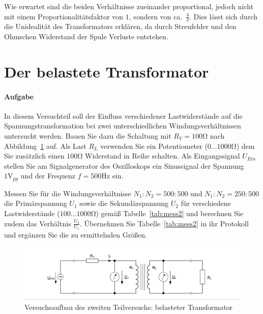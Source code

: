 \documentclass[10pt]{scrreprt}
\begin{document}
        Wie erwartet sind die beiden Verhältnisse zueinander proportional, jedoch
        nicht mit einem Proportionalitätsfaktor von $1$, sondern von ca.~$\frac{4}{3}$.
        Dies lässt sich durch die Unidealität des Transformators erklären, da durch
        Streufelder und den Ohmschen Widerstand der Spule Verluste entstehen.


        \section{Der belastete Transformator}
        \paragraph{Aufgabe}
        In diesem Versuchteil soll der Einfluss verschiedener Lastwiderstände auf die
        Spannungstransformation bei zwei unterschiedlichen Windungsverhältnissen untersucht werden.
        Bauen Sie dazu die Schaltung mit $R_V = 100\si{\ohm}$ nach Abbildung~\ref{fig:abb9} auf. Als Last $R_L$ verwenden Sie ein
        Potentiometer ($0\ldots1000\si{\ohm}$) dem Sie zusätzlich einen $100\si{\ohm}$ Widerstand in Reihe schalten.
        Als Eingangssignal $U_{Ein}$ stellen Sie am Signalgenerator des Oszilloskops ein Sinussignal
        der Spannung $1 \si{\volt}_{pp}$ und der Frequenz $f = 500\si{\hertz}$ ein.

        \vspace{0.5cm}

        Messen Sie für die Windungsverhältnisse $N_1 : N_2 = 500 : 500$ und $N_1 : N_2 = 250 : 500$
        die Primärspannung $U_1$ sowie die Sekundärspannung $U_2$ für verschiedene Lastwiderstände
        ($100\ldots1000\si{\ohm}$) gemäß Tabelle~\ref{tab:mess2} und berechnen Sie zudem das Verhältnis $\frac{U_2}{U_1}$.
        Übernehmen Sie Tabelle~\ref{tab:mess2} in ihr Protokoll und ergänzen Sie die zu ermittelnden Größen.

        \begin{center}
            \begin{figure}[H]
                \includegraphics[width=\textwidth]{aufgabenBilder/abbildung9.png}
                \caption{Versuchsaufbau des zweiten Teilversuchs: belasteter Transformator}
                \label{fig:abb9}
            \end{figure}
        \end{center}
\end{document}

